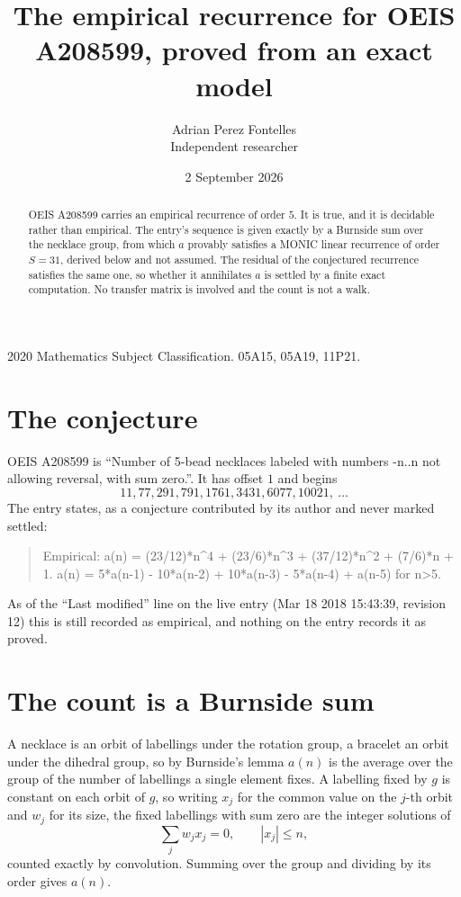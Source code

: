 \documentclass[11pt,a4paper]{article}
\title{The empirical recurrence for OEIS A208599, proved from an exact model}
\author{Adrian Perez Fontelles\\ \small Independent researcher}
\date{2 September 2026}
\theoremstyle{plain}
\theoremstyle{definition}
\begin{document}
\maketitle

\begin{abstract}
OEIS A208599 carries an empirical recurrence of order $5$. It is true, and it is
decidable rather than empirical. The entry's sequence is given exactly by a Burnside sum over the necklace group, from
which $a$ provably satisfies a MONIC linear recurrence of order $S=31$, derived below and not
assumed. The residual of the conjectured recurrence satisfies the same one, so whether it
annihilates $a$ is settled by a finite exact computation. No transfer matrix is involved and
the count is not a walk.
\end{abstract}

\noindent\small 2020 Mathematics Subject Classification. 05A15, 05A19, 11P21.\normalsize

\section{The conjecture}

OEIS A208599 is ``Number of 5-bead necklaces labeled with numbers -n..n not allowing reversal, with sum zero.''. It has offset $1$ and begins
\[
11, 77, 291, 791, 1761, 3431, 6077, 10021,\ \dots
\]
The entry states, as a conjecture contributed by its author and never marked settled:
\begin{quote}
Empirical: a(n) = (23/12)*n\^{}4 + (23/6)*n\^{}3 + (37/12)*n\^{}2 + (7/6)*n + 1. a(n) = 5*a(n-1) - 10*a(n-2) + 10*a(n-3) - 5*a(n-4) + a(n-5) for n>5.
\end{quote}
As of the ``Last modified'' line on the live entry (Mar 18 2018 15:43:39, revision 12)
this is still recorded as empirical, and nothing on the entry records it as proved.

\section{The count is a Burnside sum}

A necklace is an orbit of labellings under the rotation group, a bracelet an orbit under the
dihedral group, so by Burnside's lemma $a(n)$ is the average over the group of the number of
labellings a single element fixes. A labelling fixed by $g$ is constant on each orbit of $g$,
so writing $x_j$ for the common value on the $j$-th orbit and $w_j$ for its size, the fixed
labellings with sum zero are the integer solutions of
\[
\sum_j w_jx_j = 0,\qquad |x_j|\le n,
\]
counted exactly by convolution. Summing over the group and dividing by its order gives $a(n)$.
\end{document}
